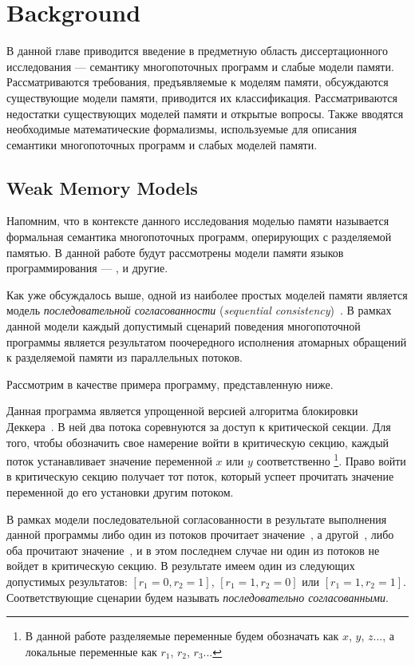 \chapter{Background}
\label{ch:review}

В данной главе приводится введение в предметную область
диссертационного исследования ---
семантику многопоточных программ и слабые модели памяти.
Рассматриваются требования, предъявляемые к моделям памяти,
обсуждаются существующие модели памяти, приводится их классификация.
Рассматриваются недостатки существующих моделей памяти
и открытые  вопросы.
Также вводятся необходимые математические формализмы,
используемые для описания семантики многопоточных программ
и слабых моделей памяти. 

\section{Weak Memory Models}
\label{sec:models-intro}

Напомним, что в контексте данного исследования
моделью памяти называется формальная семантика
многопоточных программ, оперирующих с разделяемой памятью.
В данной работе будут рассмотрены  модели памяти языков программирования 
--- \CPP, \Java и другие. 

Как уже обсуждалось выше, одной из наиболее простых моделей памяти
является модель \emph{последовательной согласованности}
(\emph{sequential consistency})~\cite{Lamport:TC79}.
В рамках данной модели каждый допустимый
сценарий поведения многопоточной программы
является результатом поочередного исполнения
атомарных обращений к разделяемой памяти из параллельных потоков.

Рассмотрим в качестве примера программу, представленную ниже.



Данная программа является упрощенной версией
алгоритма блокировки Деккера~\cite{Dijkstra:68}.
В ней два потока соревнуются за доступ к критической секции.
Для того, чтобы обозначить свое намерение войти в критическую секцию, каждый поток устанавливает значение переменной $x$ или $y$ соответственно
\footnote{В данной работе разделяемые переменные
будем обозначать как $x$, $y$, $z$..., 
а локальные переменные как $r_1$, $r_2$, $r_3$...}.
Право войти в критическую секцию получает тот поток, который успеет прочитать значение переменной до его установки другим потоком.

В рамках модели последовательной согласованности
в результате выполнения данной программы 
либо один из потоков прочитает значение~, а другой~, 
либо оба прочитают значение~, и в этом последнем случае ни один из потоков
не войдет в критическую секцию. В результате имеем один из следующих допустимых результатов:
${[r_1=0, r_2=1]}$, ${[r_1=1,r_2=0]}$ или ${[r_1=1,r_2=1]}$. 
Соответствующие сценарии  будем называть 
\emph{последовательно согласованными}.

